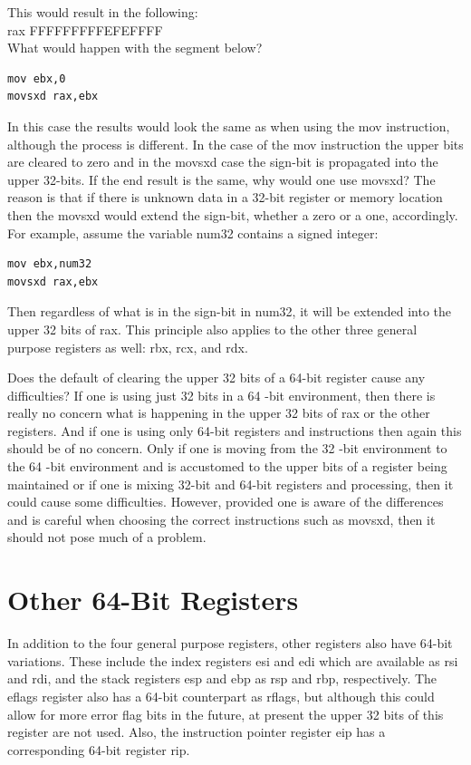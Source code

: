 \documentclass[10pt]{book}
\begin{document}
This would result in the following:\\
rax FFFFFFFFFEFEFFFF\\

What would happen with the segment below?

\begin{verbatim}
mov ebx,0
movsxd rax,ebx
\end{verbatim}

In this case the results would look the same as when using the mov instruction, although the process is different. In the case of the mov instruction the upper bits are cleared to zero and in the movsxd case the sign-bit is propagated into the upper 32-bits. If the end result is the same, why would one use movsxd? The reason is that if there is unknown data in a 32-bit register or memory location then the movsxd would extend the sign-bit, whether a zero or a one, accordingly. For example, assume the variable num32 contains a signed integer:

\begin{verbatim}
mov ebx,num32
movsxd rax,ebx
\end{verbatim}

Then regardless of what is in the sign-bit in num32, it will be extended into the upper 32 bits of rax. This principle also applies to the other three general purpose registers as well: rbx, rcx, and rdx.

Does the default of clearing the upper 32 bits of a 64-bit register cause any difficulties? If one is using just 32 bits in a 64 -bit environment, then there is really no concern what is happening in the upper 32 bits of rax or the other registers. And if one is using only 64-bit registers and instructions then again this should be of no concern. Only if one is moving from the 32 -bit environment to the 64 -bit environment and is accustomed to the upper bits of a register being maintained or if one is mixing 32-bit and 64-bit registers and processing, then it could cause some difficulties. However, provided one is aware of the differences and is careful when choosing the correct instructions such as movsxd, then it should not pose much of a problem.

\section{Other 64-Bit Registers}
In addition to the four general purpose registers, other registers also have 64-bit variations. These include the index registers esi and edi which are available as rsi and rdi, and the stack registers esp and ebp as rsp and rbp, respectively. The eflags register also has a 64-bit counterpart as rflags, but although this could allow for more error flag bits in the future, at present the upper 32 bits of this register are not used. Also, the instruction pointer register eip has a corresponding 64-bit register rip.
\end{document}
